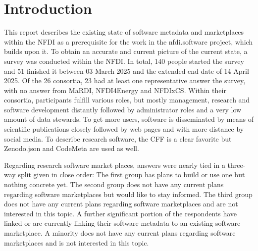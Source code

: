 \documentclass[headsepline,titlepage,twoside,12pt,toc=flat,headings=normal]{scrreprt}
\author{\theauthor}
\date{\thedate}
\title{\thetitle}
\subtitle{Deliverable 2.2}
\begin{document}

\maketitle
\imprint

\chapter*{Introduction}\label{ch:introduction}

This report describes the existing state of software metadata and marketplaces within the NFDI as a prerequisite for the work in the nfdi.software project, which builds upon it.
To obtain an accurate and current picture of the current state, a survey was conducted within the NFDI.
In total, 140 people started the survey and 51 finished it between 03 March 2025 and the extended end date of 14 April 2025.
Of the 26 consortia, 23 had at least one representative answer the survey, with no answer from MaRDI, NFDI4Energy and NFDIxCS.
Within their consortia, participants fulfill various roles, but mostly management, research and software development distantly followed by administrator roles and a very low amount of data stewards.
To get more users, software is disseminated by means of scientific publications closely followed by web pages and with more distance by social media.
To describe research software, the \acf{CFF} is a clear favorite but Zenodo.json and CodeMeta are used as well.

Regarding research software market places, answers were nearly tied in a three-way split given in close order:
The first group has plans to build or use one but nothing concrete yet.
The second group does not have any current plans regarding software marketplaces but would like to stay informed.
The third group does not have any current plans regarding software marketplaces and are not interested in this topic.
A further significant portion of the respondents have linked or are currently linking their software metadata to an existing software marketplace.
A minority does not have any current plans regarding software marketplaces and is not interested in this topic.
\end{document}

